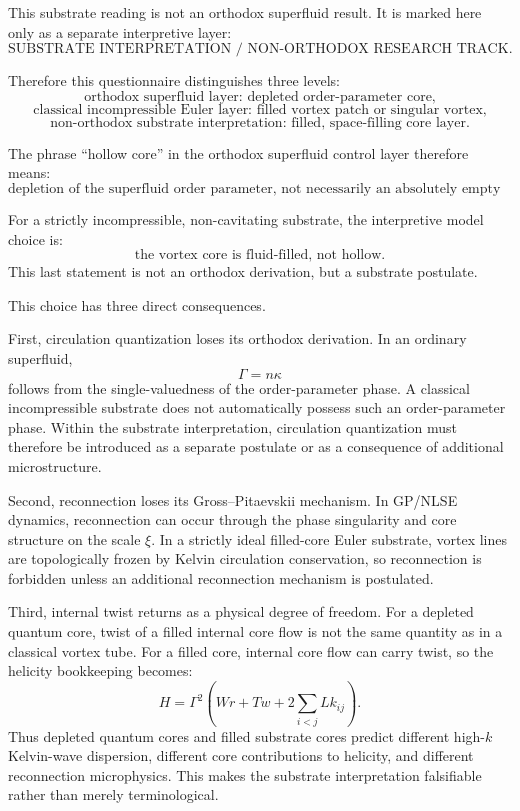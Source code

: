 \documentclass[11pt]{article}
\begin{document}
        This substrate reading is not an orthodox superfluid result. It is marked here only as a separate interpretive layer:
        \[
        \boxed{
        \text{SUBSTRATE INTERPRETATION / NON-ORTHODOX RESEARCH TRACK}.
        }
        \]
        
        Therefore this questionnaire distinguishes three levels:
        \[
        \text{orthodox superfluid layer: depleted order-parameter core,}
        \]
        \[
        \text{classical incompressible Euler layer: filled vortex patch or singular vortex,}
        \]
        \[
        \text{non-orthodox substrate interpretation: filled, space-filling core layer.}
        \]
        
        The phrase ``hollow core'' in the orthodox superfluid control layer therefore means:
        \[
        \boxed{
        \text{depletion of the superfluid order parameter, not necessarily an absolutely empty core.}
        }
        \]
        
        For a strictly incompressible, non-cavitating substrate, the interpretive model choice is:
        \[
        \boxed{
        \text{the vortex core is fluid-filled, not hollow.}
        }
        \]
        This last statement is not an orthodox derivation, but a substrate postulate.
        
        This choice has three direct consequences.
        
        First, circulation quantization loses its orthodox derivation. In an ordinary superfluid,
        \[
        \Gamma=n\kappa
        \]
        follows from the single-valuedness of the order-parameter phase. A classical incompressible substrate does not automatically possess such an order-parameter phase. Within the substrate interpretation, circulation quantization must therefore be introduced as a separate postulate or as a consequence of additional microstructure.
        
        Second, reconnection loses its Gross--Pitaevskii mechanism. In GP/NLSE dynamics, reconnection can occur through the phase singularity and core structure on the scale \(\xi\). In a strictly ideal filled-core Euler substrate, vortex lines are topologically frozen by Kelvin circulation conservation, so reconnection is forbidden unless an additional reconnection mechanism is postulated.
        
        Third, internal twist returns as a physical degree of freedom. For a depleted quantum core, twist of a filled internal core flow is not the same quantity as in a classical vortex tube. For a filled core, internal core flow can carry twist, so the helicity bookkeeping becomes:
        \[
        H
        =
        \Gamma^2
        \left(
        Wr
        +
        Tw
        +
        2\sum_{i<j}Lk_{ij}
        \right).
        \]
        Thus depleted quantum cores and filled substrate cores predict different high-\(k\) Kelvin-wave dispersion, different core contributions to helicity, and different reconnection microphysics. This makes the substrate interpretation falsifiable rather than merely terminological.
\end{document}
